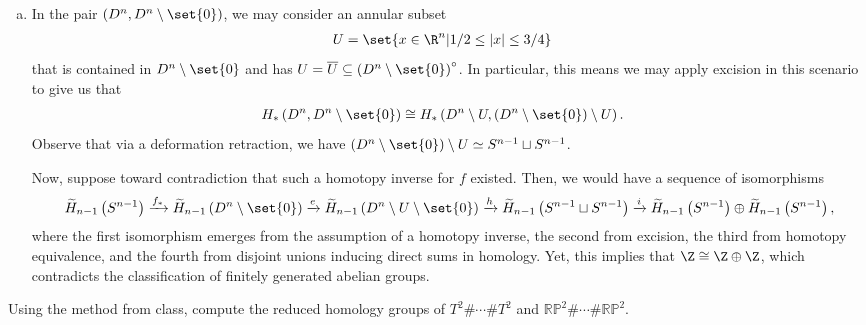 \documentclass[10pt]{mypackage}
\begin{document}
\begin{solution}
\begin{enumerate}[(a)]
      \begin{align*}
        w_0 &= f_{\ast}\left( w_2 - j_{\ast}\left( w_4 \right) \right),
      \end{align*}
      so that $f_{\ast}$ is surjective at $H_q\left( X,A \right)$.
    \item In the pair $\left( D^n,D^n\setminus \set{0} \right)$, we may consider an annular subset
      \begin{align*}
        U &= \set{x\in \R^n | 1/2\leq \left\vert x \right\vert\leq 3/4}
      \end{align*}
      that is contained in $D^n\setminus \set{0}$ and has $U = \overline{U}\subseteq \left( D^n\setminus \set{0} \right)^{\circ}$. In particular, this means we may apply excision in this scenario to give us that
      \begin{align*}
        H_{\ast}\left( D^n,D^n\setminus \set{0} \right) &\cong H_{\ast}\left( D^n\setminus U,\left( D^n\setminus \set{0} \right)\setminus U \right).
      \end{align*}
      Observe that via a deformation retraction, we have $\left( D^n\setminus \set{0} \right)\setminus U\simeq S^{n-1}\sqcup S^{n-1}$.

      Now, suppose toward contradiction that such a homotopy inverse for $f$ existed. Then, we would have a sequence of isomorphisms
      \begin{align*}
        \widetilde{H}_{n-1}\left( S^{n-1} \right)\xrightarrow{f_{\ast}} \widetilde{H}_{n-1}\left( D^n\setminus\set{0} \right)\xrightarrow{e} \widetilde{H}_{n-1}\left( D^n\setminus U\setminus \set{0} \right)\xrightarrow{h} \widetilde{H}_{n-1}\left( S^{n-1} \sqcup S^{n-1}\right) \xrightarrow{i} \widetilde{H}_{n-1}\left( S^{n-1} \right)\oplus \widetilde{H}_{n-1}\left( S^{n-1} \right),
      \end{align*}
      where the first isomorphism emerges from the assumption of a homotopy inverse, the second from excision, the third from homotopy equivalence, and the fourth from disjoint unions inducing direct sums in homology. Yet, this implies that $\Z\cong \Z\oplus\Z$, which contradicts the classification of finitely generated abelian groups.
  \end{enumerate}
\end{solution}
\begin{problem}[Problem 2]
  Using the method from class, compute the reduced homology groups of $T^2\#\cdots\# T^2$ and $ \mathbb{RP}^{2}\#\cdots\# \mathbb{RP}^2 $.
\end{problem}
\end{document}
